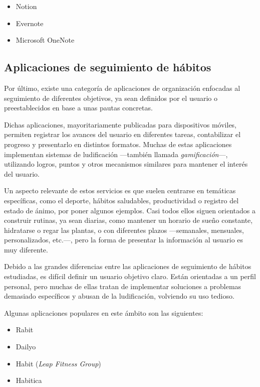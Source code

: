 \documentclass[10pt, a4paper]{aqademic}
\begin{document}
\begin{itemize}
	\item Notion
	\item Evernote
	\item Microsoft OneNote
\end{itemize}

\subsection*{Aplicaciones de seguimiento de hábitos}

Por último, existe una categoría de aplicaciones de organización enfocadas al seguimiento de diferentes objetivos, ya sean definidos por el usuario o preestablecidos en base a unas pautas concretas. 

\medskip

Dichas aplicaciones, mayoritariamente publicadas para dispositivos móviles, permiten registrar los avances del usuario en diferentes tareas, contabilizar el progreso y presentarlo en distintos formatos. Muchas de estas aplicaciones implementan sistemas de ludificación \cite{inproceedings} ---también llamada \textit{gamificación}---, utilizando logros, puntos y otros mecanismos similares para mantener el interés del usuario.

\medskip

Un aspecto relevante de estos servicios es que suelen centrarse en temáticas específicas, como el deporte, hábitos saludables, productividad o registro del estado de ánimo, por poner algunos ejemplos. Casi todos ellos siguen orientados a construir rutinas, ya sean diarias, como mantener un horario de sueño constante, hidratarse o regar las plantas, o con diferentes plazos ---semanales, mensuales, personalizados, etc.---, pero la forma de presentar la información al usuario es muy diferente. 

\medskip

Debido a las grandes diferencias entre las aplicaciones de seguimiento de hábitos estudiadas, es difícil definir un usuario objetivo claro. Están orientadas a un perfil personal, pero muchas de ellas tratan de implementar soluciones a problemas demasiado específicos y abusan de la ludificación, volviendo su uso tedioso.

\medskip

Algunas aplicaciones populares en este ámbito son las siguientes:

\begin{itemize}
	\item Rabit
	\item Dailyo
	\item Habit (\textit{Leap Fitness Group})
	\item Habitica
\end{itemize}
\end{document}
